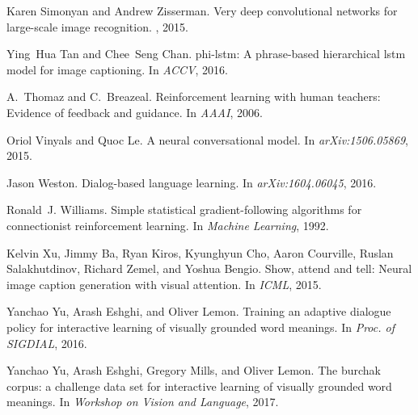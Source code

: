 \documentclass{article}
\begin{document}
\begin{thebibliography}{10}
Karen Simonyan and Andrew Zisserman.
\newblock Very deep convolutional networks for large-scale image recognition.
, 2015.

Ying~Hua Tan and Chee~Seng Chan.
\newblock phi-lstm: A phrase-based hierarchical lstm model for image
  captioning.
\newblock In {\em ACCV}, 2016.

A.~Thomaz and C.~Breazeal.
\newblock Reinforcement learning with human teachers: Evidence of feedback and
  guidance.
\newblock In {\em AAAI}, 2006.

Oriol Vinyals and Quoc Le.
\newblock A neural conversational model.
\newblock In {\em arXiv:1506.05869}, 2015.

Jason Weston.
\newblock Dialog-based language learning.
\newblock In {\em arXiv:1604.06045}, 2016.

Ronald~J. Williams.
\newblock Simple statistical gradient-following algorithms for connectionist
  reinforcement learning.
\newblock In {\em Machine Learning}, 1992.

Kelvin Xu, Jimmy Ba, Ryan Kiros, Kyunghyun Cho, Aaron Courville, Ruslan
  Salakhutdinov, Richard Zemel, and Yoshua Bengio.
\newblock Show, attend and tell: Neural image caption generation with visual
  attention.
\newblock In {\em ICML}, 2015.

Yanchao Yu, Arash Eshghi, and Oliver Lemon.
\newblock Training an adaptive dialogue policy for interactive learning of
  visually grounded word meanings.
\newblock In {\em Proc. of SIGDIAL}, 2016.

Yanchao Yu, Arash Eshghi, Gregory Mills, and Oliver Lemon.
\newblock The burchak corpus: a challenge data set for interactive learning of
  visually grounded word meanings.
\newblock In {\em Workshop on Vision and Language}, 2017.

\end{thebibliography}

\small{}
\end{document}
